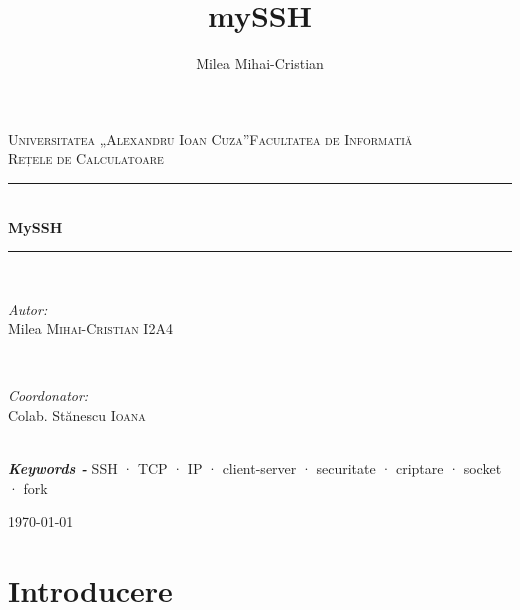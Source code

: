 \documentclass{article}
\title{mySSH}
\author{Milea Mihai-Cristian}
\providecommand{\keywords}[1]{\textbf{\textit{Keywords -}} #1}
\begin{document}
	\begin{titlepage}
		
		\newcommand{\HRule}{\rule{\linewidth}{0.5mm}} 
		
		\center 
		\vspace*{\fill}
		
		\textsc{\LARGE Universitatea „Alexandru Ioan Cuza”\newline Facultatea de Informatiă}\\[1.5cm] 
		\textsc{\Large Rețele de Calculatoare}\\[0.5cm] 
		
		\HRule \\[0.4cm]
		{ \huge \bfseries MySSH }\\[0.4cm] 
		\HRule \\[1.5cm]
		
		
		
		\begin{minipage}{0.4\textwidth}
			\begin{flushleft} \large
				\emph{Autor:}\\
				Milea \textsc{Mihai-Cristian I2A4} 
			\end{flushleft}
		\end{minipage}
		~
		\begin{minipage}{0.4\textwidth}
			\begin{flushright} \large
				\emph{Coordonator:} \\
				Colab. Stănescu \textsc{Ioana} 
			\end{flushright}
		\end{minipage}\\[2cm]
		\keywords{
			\centering SSH · TCP · IP · client-server · securitate · criptare · socket · fork
		}
		\newline
		
		
		{\large \today}\\[1cm] 
		
		\vfill
		
	\end{titlepage}
	\newpage
	
	\tableofcontents
	
	\newpage
	\section{Introducere}
	
\end{document}
